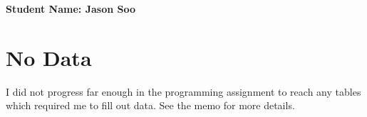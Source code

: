 \documentclass[11pt]{article}
\begin{document}
	\textbf{Student Name: Jason Soo}
	\section{No Data} %
	\label{sec:algorithm}
	I did not progress far enough in the programming assignment to reach any tables which required me to fill out data.  See the memo for more details.
	
	
\end{document}

